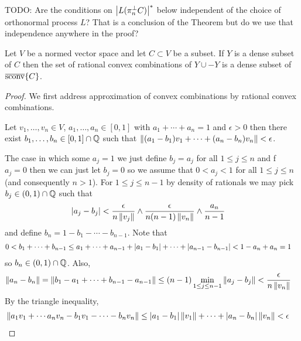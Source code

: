 TODO: Are the conditions on $\left \vert L(\pi_n^\perp C) \right \vert^*$ below independent of the choice of orthonormal process $L$?  That is a conclusion of the Theorem but do we use that independence anywhere in the proof?

\begin{lem}\label{lem:DenseSubsetClosedSymmetricConvexHull}Let $V$ be a normed vector space and let $C \subset V$ be a subset.  If $Y$ is a dense subset of $C$ then the set of rational convex combinations of $Y \cup -Y$ is a dense subset of $\overline{\operatorname*{sconv}}\{C\}$.
\end{lem}
\begin{proof}
We first address approximation of convex combinations by rational convex combinations.
\begin{clm}Let $v_1, \dotsc, v_n \in V$, $a_1, \dotsc, a_n \in [0,1]$ with $a_1 + \dotsb + a_n = 1$ and $\epsilon > 0$ then there exist $b_1, \dotsc, b_n \in [0,1] \cap \mathbb{Q}$ such that $\left \lVert (a_1-b_1) v_1 + \dotsb + (a_n - b_n) v_n \right \rVert < \epsilon$.
\end{clm}
 The case in which some $a_j=1$ we just define $b_j=a_j$ for all $1 \leq j \leq n$ and f $a_j=0$ then we can just let $b_j=0$ so we assume that $0 < a_j < 1$ for all $1 \leq j \leq n$ (and consequently $n > 1$). For $1 \leq j \leq n -1$ by density of rationals we may pick $b_j \in (0,1) \cap \mathbb{Q}$ such that 
\begin{align*}
\left \vert a_j-b_j \right \vert &< \frac{\epsilon}{n\left \lVert v_j \right \rVert} \wedge \frac{\epsilon}{n(n-1)\left \lVert v_n \right \rVert} \wedge \frac{a_n}{n-1}
\end{align*}
and define $b_n = 1 - b_1 - \dotsb - b_{n-1}$.  Note that 
\begin{align*}
0 &< b_1 + \dotsb + b_{n-1} \leq a_1 + \dotsb + a_{n-1} + \left \vert a_1 - b_1 \right \vert + \dotsb + \left \vert a_{n-1} - b_{n-1}  \right \vert < 1 - a_n + a_n = 1
\end{align*}
so $b_n \in (0,1) \cap \mathbb{Q}$.  Also,
\begin{align*}
\left \lVert a_n - b_n \right \rVert &=\left \lVert b_1 - a_1 + \dotsb + b_{n-1} - a_{n-1} \right \rVert \leq (n-1) \min_{1 \leq j \leq n-1} \left \lVert a_j - b_j \right \rVert < \frac{\epsilon}{n\left \lVert v_n \right \rVert}
\end{align*}
By the triangle inequality,
\begin{align*}
\left \lVert a_1 v_1 + \dotsb a_n v_n - b_1 v_1 - \dotsb - b_n v_n \right \rVert 
&\leq \left \vert a_1-b_1 \right \vert \left \lVert v_1 \right \rVert + \dotsb + \left \vert a_n - b_n \right \vert\left \lVert v_n \right \rVert 
< \epsilon
\end{align*}


\end{proof}
